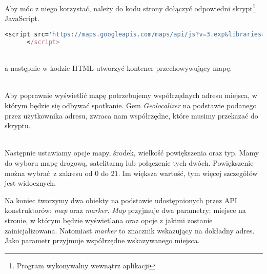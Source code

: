 Aby móc z niego korzystać, należy do kodu strony dołączyć odpowiedni skrypt\footnote{Program wykonywalny wewnątrz aplikacji} JavaScript.
\begin{code}
  \begin{lstlisting}[language=Ruby, basicstyle=\ttfamily\scriptsize, showstringspaces=false]
      <script src='https://maps.googleapis.com/maps/api/js?v=3.exp&libraries=places'>
      </script>
  \end{lstlisting}
\end{code}\\

a następnie w kodzie HTML utworzyć kontener przechowywujący mapę.
\begin{code}
  
\end{code}\\

Aby poprawnie wyświetlić mapę potrzebujemy współrzędnych adresu miejsca, w którym będzie się odbywać spotkanie. Gem \emph{Geolocalizer} na podstawie podanego przez użytkownika adresu, zwraca nam współrzędne, które musimy przekazać do skryptu.

\begin{code}
  
\end{code}\\

Następnie ustawiamy opcje mapy, środek, wielkość powiększenia oraz typ. Mamy do wyboru mapę drogową, satelitarną lub połączenie tych dwóch. Powiększenie można wybrać z zakresu od 0 do 21. Im większa wartość, tym więcej szczegółów jest widocznych. 

Na koniec tworzymy dwa obiekty na podstawie udostępnionych przez API konstruktorów: \emph{map} oraz \emph{marker}. \emph{Map} przyjmuje dwa parametry: miejsce na stronie, w którym będzie wyświetlana oraz opcje z jakimi zostanie zainicjalizowana.
Natomiast \emph{marker} to znacznik wskazujący na dokładny adres. Jako parametr przyjmuje współrzędne wskazywanego miejsca. 

